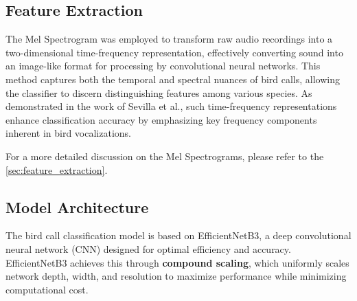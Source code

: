       \subsection{Feature Extraction}
      The Mel Spectrogram was employed to transform raw audio recordings into a two-dimensional time-frequency representation, effectively converting sound into an image-like format for processing by convolutional neural networks. This method captures both the temporal and spectral nuances of bird calls, allowing the classifier to discern distinguishing features among various species. As demonstrated in the work of Sevilla et al.\cite{sevilla2017audio}, such time-frequency representations enhance classification accuracy by emphasizing key frequency components inherent in bird vocalizations.

      For a more detailed discussion on the Mel Spectrograms, please refer to the \ref{sec:feature_extraction}.

      
      \subsection{Model Architecture}

      The bird call classification model is based on EfficientNetB3, a deep convolutional neural network (CNN) designed for optimal efficiency and accuracy. EfficientNetB3 achieves this through \textbf{compound scaling}, which uniformly scales network depth, width, and resolution to maximize performance while minimizing computational cost.
      
